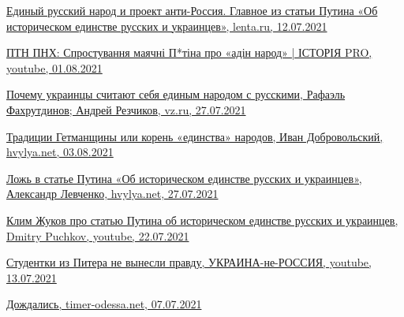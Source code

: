 \href{https://lenta.ru/brief/2021/07/12/odin_narod/}{%
Единый русский народ и проект анти-Россия. Главное из статьи Путина «Об историческом единстве русских и украинцев», %
lenta.ru, 12.07.2021%
}

\href{https://www.youtube.com/watch?v=E2f7VreiQjU}{%
ПТН ПНХ: Спростування маячні П*тіна про «адін народ» | ІСТОРІЯ PRO, youtube, 01.08.2021%
}

\href{https://vz.ru/world/2021/7/27/1111068.html}{%
Почему украинцы считают себя единым народом с русскими, Рафаэль Фахрутдинов; Андрей Резчиков, vz.ru, 27.07.2021%
%
}

\href{https://analytics.hvylya.net/235008-tradicii-getmanshchiny-ili-koren-edinstva-narodov}{%
Традиции Гетманщины или корень «единства» народов, Иван Добровольский, hvylya.net, 03.08.2021%
}

\href{https://analytics.hvylya.net/234552-lozh-v-state-putina-o-istoricheskom-edinstve-russkih-i-ukraincev}{%
Ложь в статье Путина «Об историческом единстве русских и украинцев», Александр Левченко, hvylya.net, 27.07.2021%
}

\href{https://www.youtube.com/watch?v=QnS-8kiyPUw}{%
Клим Жуков про статью Путина об историческом единстве русских и украинцев, Dmitry Puchkov,  youtube, 22.07.2021%
}

\href{https://www.youtube.com/watch?v=Bfu53UbqJf8}{%
Студентки из Питера не вынесли правду, УКРАИНА-не-РОССИЯ, youtube, 13.07.2021%
}

\href{https://timer-odessa.net/minds/dozhdalis_552.html}{%
Дождались, timer-odessa.net, 07.07.2021%
}
